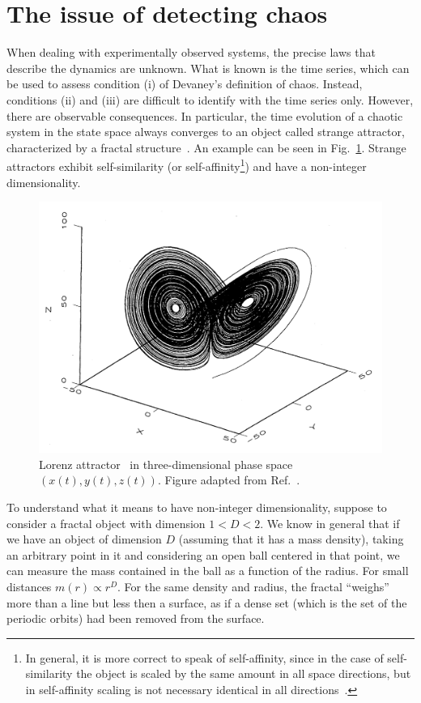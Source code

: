 \section{The issue of detecting chaos}\label{sec: chaos in experiments}

When dealing with experimentally observed systems, the precise laws that describe the dynamics are unknown.
What is known is the time series, which can be used to assess condition (i) of Devaney's definition
of chaos. Instead, conditions (ii) and (iii) are difficult to identify with the time series only.
However, there are observable consequences. In particular, the time
evolution of a chaotic system in the state space always converges to an object called strange
attractor, characterized by a fractal structure~\cite{ref:fractal_dim,ref:fractal_book}.
An example can be seen in Fig.~\ref{fig: lorenz attractor}. Strange
attractors exhibit self-similarity (or self-affinity\footnote{In general, it is more correct to speak
of self-affinity, since in the case of self-similarity the
object is scaled by the same amount in all space directions, but in self-affinity scaling is not
necessary identical in all directions~\cite{ref:mandelbrot_fractal}.}) and have a non-integer dimensionality.

\begin{figure}[!htbp]
\centering
\includegraphics[width=.6\linewidth]{images/lorenz_attractor.png}
\caption{
    Lorenz attractor~\cite{lorenz1963deterministic} in three-dimensional phase space
    $(x(t),y(t),z(t))$. Figure adapted from Ref.~\cite{ref:abarbanel_fourier_spectra}.
}\label{fig: lorenz attractor}
\end{figure}

To understand what it means to have non-integer dimensionality, suppose
to consider a fractal object with dimension $1 < D < 2$.
We know in general that if we have an object of dimension $D$ (assuming that
it has a mass density), taking an arbitrary point in it and considering an open
ball centered in that point, we can measure the mass contained in the ball as
a function of the radius. For small distances $m(r)\propto r^D$. For the same density
and radius, the fractal ``weighs'' more than a line but less then a surface, as if
a dense set (which is the set of the periodic orbits) had been removed from the
surface.

